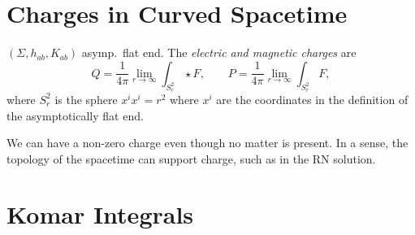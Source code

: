 \section{Charges in Curved Spacetime}%
\label{sec:charges_in_curved_spacetime}

\begin{definition}[]
  \label{def:charges}
  $(\Sigma, h_{ab}, K_{ab})$ asymp.~flat end. The \emph{electric and magnetic charges} are 
  \begin{equation}
    Q = \frac{1}{4 \pi} \lim_{r \to \infty} \int_{S^2_r} \star F,  \qquad
    P = \frac{1}{4 \pi} \lim_{r \to \infty} \int_{S^2_r} F,
  \end{equation}
  where $S^2_r$ is the sphere $x^{i} x^{i} = r^2$ where $x^{i}$ are the coordinates in the definition of the asymptotically flat end.
\end{definition}
\begin{leftbar}
  We can have a non-zero charge even though no matter is present. In a sense, the topology of the spacetime can support charge, such as in the RN solution.
\end{leftbar}

\section{Komar Integrals}%
\label{sec:komar_integrals}

